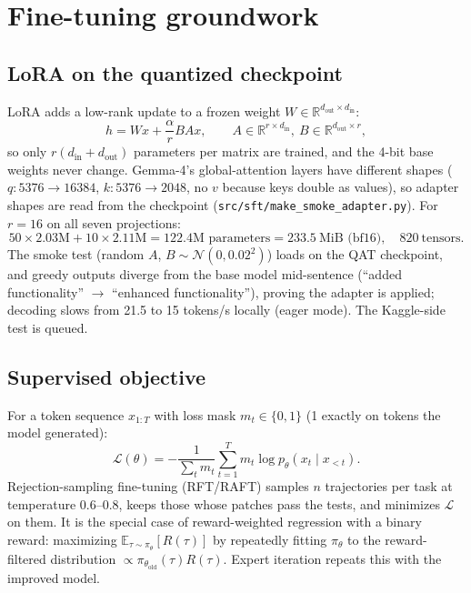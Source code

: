 \documentclass[10pt,a4paper]{article}
\newcommand{\code}[1]{\texttt{#1}}
\newcommand{\R}{\mathbb{R}}
\newcommand{\E}{\mathbb{E}}
\newcommand{\1}{\mathbb{1}}
\begin{document}
\section{Fine-tuning groundwork}
\label{sec:sft}
\subsection{LoRA on the quantized checkpoint}
LoRA adds a low-rank update to a frozen weight $W\in\R^{d_\text{out}\times d_\text{in}}$:
\[
h=Wx+\frac{\alpha}{r}BAx,\qquad A\in\R^{r\times d_\text{in}},\ B\in\R^{d_\text{out}\times r},
\]
so only $r(d_\text{in}+d_\text{out})$ parameters per matrix are trained, and the 4-bit base weights never change.
Gemma-4's global-attention layers have different shapes ($q: 5376\to16384$, $k: 5376\to2048$, no $v$ because
keys double as values), so adapter shapes are read from the checkpoint (\code{src/sft/make\_smoke\_adapter.py}).
For $r=16$ on all seven projections:
\[
50\times2.03\text{M}+10\times2.11\text{M}=122.4\text{M parameters}=233.5\ \text{MiB (bf16)},\quad 820\ \text{tensors}.
\]
The smoke test (random $A$, $B\sim\mathcal N(0,0.02^2)$) loads on the QAT checkpoint, and greedy outputs diverge
from the base model mid-sentence (``added functionality'' $\to$ ``enhanced functionality''), proving the adapter is
applied; decoding slows from 21.5 to 15 tokens/s locally (eager mode). The Kaggle-side test is queued.

\subsection{Supervised objective}
For a token sequence $x_{1:T}$ with loss mask $m_t\in\{0,1\}$ (1 exactly on tokens the model generated):
\[
\mathcal L(\theta)=-\frac{1}{\sum_t m_t}\sum_{t=1}^T m_t\log p_\theta(x_t\mid x_{<t}).
\]
Rejection-sampling fine-tuning (RFT/RAFT) samples $n$ trajectories per task at temperature 0.6--0.8, keeps those
whose patches pass the tests, and minimizes $\mathcal L$ on them. It is the special case of reward-weighted
regression with a binary reward: maximizing $\E_{\tau\sim\pi_\theta}[R(\tau)]$ by repeatedly fitting $\pi_\theta$ to the
reward-filtered distribution $\propto\pi_{\theta_\text{old}}(\tau)R(\tau)$. Expert iteration repeats this with the improved model.
\end{document}
